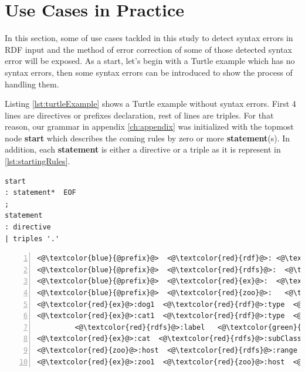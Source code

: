 \vspace{-5mm}

\section{Use Cases in Practice}
In this section, some of use cases tackled in this study to detect syntax errors in RDF input and  the method of error correction of some of those detected syntax error will be exposed. As a start, let's begin with a Turtle example which has no syntax errors, then some syntax errors can be introduced to show the process of handling them. 
	\vspace{5mm} %

Listing \ref{lst:turtleExample} shows a Turtle example without syntax errors. First 4 lines are directives or prefixes declaration, rest of lines are triples.  For that reason, our grammar in appendix \ref{ch:appendix} was initialized with the topmost node \textbf{start}  which describes the coming rules by zero or more  \textbf{statement}(s). In addition, each \textbf{statement} is either a directive or a triple as it is represent in \ref{lst:startingRules}.

\begin{lstlisting}[label=lst:startingRules, caption={Starting rules in the grammar file}] 
start
: statement*  EOF
;
statement
: directive
| triples '.'
\end{lstlisting}

\begin{lstlisting}[label=lst:turtleExample, numbers=left, caption={RDF example in Turtle serialization format}]
<@\textcolor{blue}{@prefix}@>  <@\textcolor{red}{rdf}@>: <@\textcolor{orange}{<http://www.w3.org/1999/02/22-rdf-syntax-ns\#>}@> .
<@\textcolor{blue}{@prefix}@>  <@\textcolor{red}{rdfs}@>:  <@\textcolor{orange}{<http://www.w3.org/2000/01/rdf-schema\#>}@> .
<@\textcolor{blue}{@prefix}@>  <@\textcolor{red}{ex}@>:  <@\textcolor{orange}{<http://example.org/>}@> .
<@\textcolor{blue}{@prefix}@>  <@\textcolor{red}{zoo}@>:   <@\textcolor{orange}{<http://example.org/zoo/> }@> .
<@\textcolor{red}{ex}@>:dog1  <@\textcolor{red}{rdf}@>:type  <@\textcolor{red}{ex}@>:animal .
<@\textcolor{red}{ex}@>:cat1  <@\textcolor{red}{rdf}@>:type  <@\textcolor{red}{ex}@>:cat ;
         <@\textcolor{red}{rdfs}@>:label   <@\textcolor{green}{"Lusi"@en}@> .
<@\textcolor{red}{ex}@>:cat  <@\textcolor{red}{rdfs}@>:subClassOf  <@\textcolor{red}{ex}@>:animal .
<@\textcolor{red}{zoo}@>:host  <@\textcolor{red}{rdfs}@>:range  <@\textcolor{red}{ex}@>:animal .
<@\textcolor{red}{ex}@>:zoo1  <@\textcolor{red}{zoo}@>:host  <@\textcolor{red}{ex}@>:cat2 .
\end{lstlisting}



